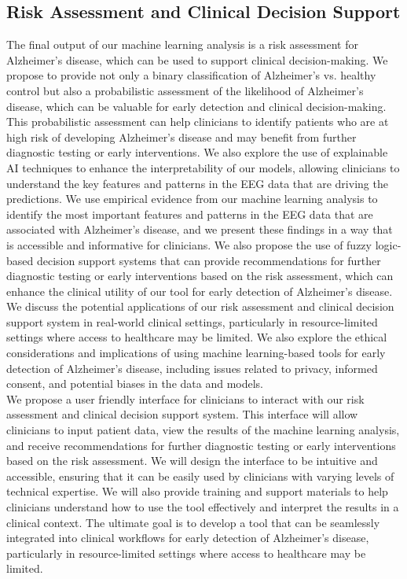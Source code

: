 \documentclass[openany]{book}
\begin{document}
\subsection{Risk Assessment and Clinical Decision Support}
The final output of our machine learning analysis is a risk assessment for Alzheimer's disease, which can be used to support clinical decision-making. We propose to provide not only a binary classification of Alzheimer's vs. healthy control but also a probabilistic assessment of the likelihood of Alzheimer's disease, which can be valuable for early detection and clinical decision-making. This probabilistic assessment can help clinicians to identify patients who are at high risk of developing Alzheimer's disease and may benefit from further diagnostic testing or early interventions. We also explore the use of explainable AI techniques to enhance the interpretability of our models, allowing clinicians to understand the key features and patterns in the EEG data that are driving the predictions. We use empirical evidence from our machine learning analysis to identify the most important features and patterns in the EEG data that are associated with Alzheimer's disease, and we present these findings in a way that is accessible and informative for clinicians. We also propose the use of fuzzy logic-based decision support systems that can provide recommendations for further diagnostic testing or early interventions based on the risk assessment, which can enhance the clinical utility of our tool for early detection of Alzheimer's disease. We discuss the potential applications of our risk assessment and clinical decision support system in real-world clinical settings, particularly in resource-limited settings where access to healthcare may be limited. We also explore the ethical considerations and implications of using machine learning-based tools for early detection of Alzheimer's disease, including issues related to privacy, informed consent, and potential biases in the data and models. \\ 
We propose a user friendly interface for clinicians to interact with our risk assessment and clinical decision support system. This interface will allow clinicians to input patient data, view the results of the machine learning analysis, and receive recommendations for further diagnostic testing or early interventions based on the risk assessment. We will design the interface to be intuitive and accessible, ensuring that it can be easily used by clinicians with varying levels of technical expertise. We will also provide training and support materials to help clinicians understand how to use the tool effectively and interpret the results in a clinical context. The ultimate goal is to develop a tool that can be seamlessly integrated into clinical workflows for early detection of Alzheimer's disease, particularly in resource-limited settings where access to healthcare may be limited. \\
\end{document}
